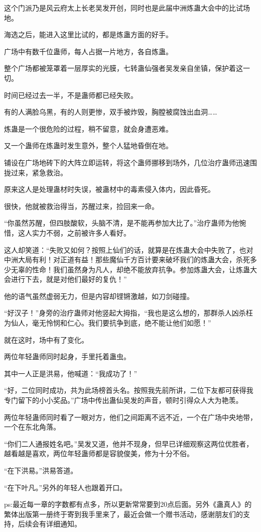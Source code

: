 \begin{this_body}
这个门派乃是风云府太上长老吴发开创，同时也是此届中洲炼蛊大会中的比试场地。

海选之后，能进入这里比试的，都是炼蛊方面的好手。

广场中有数千位蛊师，每人占据一片地方，各自炼蛊。

整个广场都被笼罩着一层厚实的光膜，七转蛊仙强者吴发亲自坐镇，保护着这一切。

时间已经过去一半，不是蛊师都已经失败。

有的人满脸乌黑，有的人则更惨，双手被炸毁，胸膛被腐蚀出血洞……

炼蛊是一个很危险的过程，稍不留意，就会身遭恶难。

又一个蛊师在炼蛊时发生意外，整个人猛地昏倒在地。

铺设在广场地砖下的大阵立即运转，将这个蛊师挪移到场外，几位治疗蛊师迅速围拢过来，紧急救治。

原来这人是处理蛊材时失误，被蛊材中的毒素侵入体内，因此昏死。

很快，他就被救治得当，苏醒过来，捡回来一命。

“你虽然苏醒，但四肢酸软，头脑不清，是不能再参加大比了。”治疗蛊师为他惋惜，这人实力不弱，之前被许多人看好。

这人却笑道：“失败又如何？按照上仙们的话，就算是在炼蛊大会中失败了，也对中洲大局有利！对正道有益！那些魔仙千方百计要来破坏我们的炼蛊大会，杀死多少无辜的性命！我们虽然身为凡人，却绝不能放弃抗争。参加炼蛊大会，让炼蛊大会进行下去，就是对他们最好的复仇！”

他的语气虽然虚弱无力，但是内容却铿锵激越，如刀剑碰撞。

“好汉子！”身旁的治疗蛊师对他竖起大拇指，“我也是这么想的，那群杀人凶杀枉为仙人，毫无怜悯和仁心。我们要抗争到底，绝不能让他们如愿！”

就在这时，场中有了变化。

两位年轻蛊师同时起身，手里托着蛊虫。

其中一人正是洪易，他喊道：“我成功了！”

“好，二位同时成功，共为此场榜首头名。按照我先前所讲，二位下友都可获得我专门留下的小小奖品。”广场中传出蛊仙吴发的声音，顿时引得众人大为艳羡。

两位年轻蛊师同时看了一眼对方，他们之间距离不远不近，一个在广场中央地带，一个在东北角落。

“你们二人通报姓名吧。”吴发又道，他并不现身，但早已详细观察这两位优胜者，越看越是喜欢，两位年轻蛊师都是容貌俊美，修为十分不俗。

“在下洪易。”洪易答道。

“在下叶凡。”另外的年轻人也跟着开口。

ps:最近每一章的字数都有点多，所以更新常常要到20点后面。另外《蛊真人》的繁体出版第一册终于寄到我手里来了，最近会做一个赠书活动，感谢朋友们的支持，后续会有详细通知。

\end{this_body}

